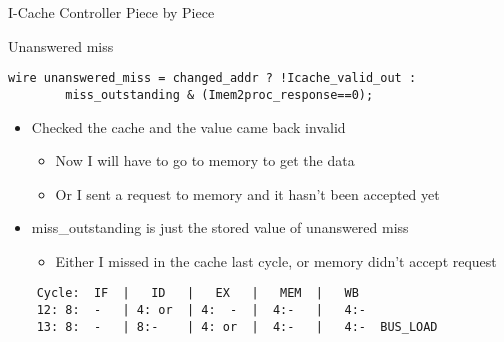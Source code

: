 \documentclass[table,dvipsnames]{beamer}
\begin{document}
\begin{frame}[fragile]{I-Cache Controller Piece by Piece}
	\begin{block}{Unanswered miss}
		\begin{verbatim}
wire unanswered_miss = changed_addr ? !Icache_valid_out :
		miss_outstanding & (Imem2proc_response==0);
		\end{verbatim}

	\begin{itemize}
		\item Checked the cache and the value came back invalid 
		\begin{itemize}
			\item Now I will have to go to memory to get the data
			\item Or I sent a request to memory and it hasn't been accepted yet
		\end{itemize}
		\item miss\_outstanding is just the stored value of unanswered miss
		\begin{itemize}
			\item Either I missed in the cache last cycle, or memory didn't accept request
		\end{itemize}
	\end{itemize}
	\begin{verbatim}
	Cycle: 	IF 	|   ID   |   EX   |   MEM  |   WB
	12: 8:  -   | 4: or  | 4:  -  |  4:-   |   4:-
	13: 8:  -   | 8:-    | 4: or  |	 4:-   |   4:-  BUS_LOAD
	\end{verbatim}

	\end{block}	
\end{frame}
\end{document}
